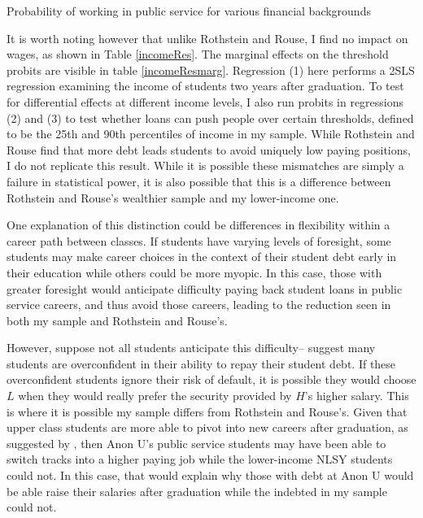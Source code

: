\documentclass[12pt]{article}
\newcommand{\regs}{../Analysis/Regressions/Output/}
\begin{document}
	\begin{table}
		\centering 
		\caption{Probability of working in public service for various financial backgrounds}
		
		\label{probest}
	\end{table}
	
	It is worth noting however that unlike Rothstein and Rouse, I find no impact on wages, as shown in Table \ref{incomeRes}. The marginal effects on the threshold probits are visible in table \ref{incomeResmarg}. Regression (1) here performs a 2SLS regression examining the income of students two years after graduation. To test for differential effects at different income levels, I also run probits in regressions (2) and (3) to test whether loans can push people over certain thresholds, defined to be the 25th and 90th percentiles of income in my sample. While Rothstein and Rouse find that more debt leads students to avoid uniquely low paying positions, I do not replicate this result. While it is possible these mismatches are simply a failure in statistical power, it is also possible that this is a difference between Rothstein and Rouse's wealthier sample and my lower-income one. 
	
	One explanation of this distinction could be differences in flexibility within a career path between classes. If students have varying levels of foresight, some students may make career choices in the context of their student debt early in their education while others could be more myopic. In this case, those with greater foresight would anticipate difficulty paying back student loans in public service careers, and thus avoid those careers, leading to the reduction seen in both my sample and Rothstein and Rouse's. 
	
	However, suppose not all students anticipate this difficulty--\textcite{smith2013} suggest many students are overconfident in their ability to repay their student debt. If these overconfident students ignore their risk of default, it is possible they would choose $L$ when they would really prefer the security provided by $H$'s higher salary. This is where it is possible my sample differs from Rothstein and Rouse's. Given that upper class students are more able to pivot into new careers after graduation, as suggested by \textcite{mcleod2009}, then Anon U's public service students may have been able to switch tracks into a higher paying job while the lower-income NLSY students could not. In this case, that would explain why those with debt at Anon U would be able raise their salaries after graduation while the indebted in my sample could not.
	
\end{document}
